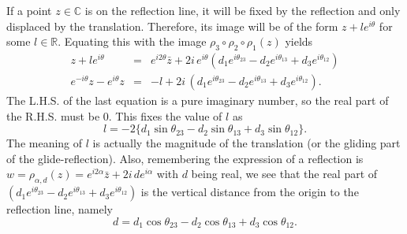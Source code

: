 \documentclass{article}
\begin{document}
If a point $z \in \mathbb{C}$ is on the reflection line, it will be fixed by the reflection and only displaced by the translation. 
Therefore, its image will be of the form $z + l e^{i\theta}$ for some $l \in \mathbb{R}$.
Equating this with the image $\rho_{3} \circ \rho_{2} \circ \rho_{1} (z)$ yields
\begin{eqnarray}
\label{eq:gliding-length}
z + l e^{i\theta}  &=& e^{i2\theta} \bar{z} + 2i \, e^{i\theta}( d_{1} e^{i\theta_{23}} - d_{2} e^{i\theta_{13}} + d_{3} e^{i\theta_{12}}) \nonumber \\
e^{-i\theta} z - e^{i\theta} z  &=& -l + 2i\,( d_{1} e^{i\theta_{23}} - d_{2} e^{i\theta_{13}} + d_{3} e^{i\theta_{12}}). 
\end{eqnarray}
The L.H.S. of the last equation is a pure imaginary number, so the real part of the R.H.S. must be $0$. 
This fixes the value of $l$ as
\begin{equation}
l = - 2 \{ d_{1} \sin{\theta_{23}} - d_{2} \sin{\theta_{13}} + d_{3} \sin{\theta_{12}}\}.
\end{equation}
The meaning of $l$ is actually the magnitude of the translation (or the gliding part of the glide-reflection).
Also, remembering the expression of a reflection is $w = \rho_{\alpha,d} (z) = e^{i2\alpha} \bar{z} + 2i \, de^{i\alpha}$ with $d$ being real, 
we see that the real part of $( d_{1} e^{i\theta_{23}} - d_{2} e^{i\theta_{13}} + d_{3} e^{i\theta_{12}})$ is the vertical distance from the origin to the reflection line, namely
\begin{equation}
d = d_{1} \cos{\theta_{23}} - d_{2} \cos{\theta_{13}} + d_{3} \cos{\theta_{12}}.
\end{equation}
\end{document}
